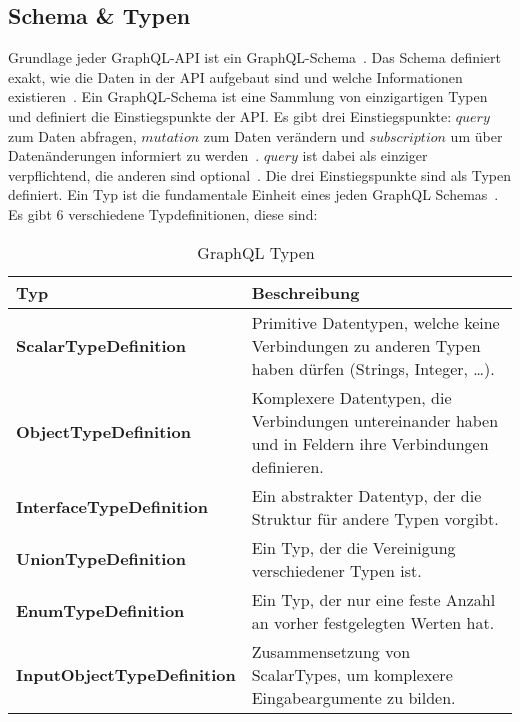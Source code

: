 \subsection{Schema \& Typen}
\label{schematypes}

Grundlage jeder GraphQL-API ist ein GraphQL-Schema~\cite[vgl. Core Concepts]{graphqlspecification}.
Das Schema definiert exakt, wie die Daten in der API aufgebaut sind und welche Informationen existieren~\cite[vgl. 3.2 Schema]{graphqlspecification}.
Ein GraphQL-Schema ist eine Sammlung von einzigartigen Typen und definiert die Einstiegspunkte der API.
Es gibt drei Einstiegspunkte: $query$ zum Daten abfragen, $mutation$ zum Daten verändern und $subscription$ um über Datenänderungen informiert zu werden~\cite[vgl. 3.2.1 Root Operation Types]{graphqlspecification}.
$query$ ist dabei als einziger verpflichtend, die anderen sind optional~\cite[vgl. 3.2.1]{graphqlspecification}.
Die drei Einstiegspunkte sind als Typen definiert.
Ein Typ ist die fundamentale Einheit eines jeden GraphQL Schemas~\cite[vgl. 3.4 Types]{graphqlspecification}.
\newpage
Es gibt 6 verschiedene Typdefinitionen, diese sind:

\begin{center}
    \begin{table}[!ht]
        \begin{tabularx}{\textwidth}{|C|C|}
            \hline
            \textbf{ Typ } & \textbf{ Beschreibung} \\
            \hline
            \textbf{ ScalarTypeDefinition } & Primitive Datentypen, welche keine Verbindungen zu anderen Typen haben dürfen (Strings, Integer, \ldots). \\
            \hline
            \textbf{ ObjectTypeDefinition  } & Komplexere Datentypen, die Verbindungen untereinander haben und in Feldern ihre Verbindungen definieren. \\
            \hline
            \textbf{ InterfaceTypeDefinition } & Ein abstrakter Datentyp, der die Struktur für andere Typen vorgibt. \\
            \hline
            \textbf{ UnionTypeDefinition } & Ein Typ, der die Vereinigung verschiedener Typen ist. \\
            \hline
            \textbf{ EnumTypeDefinition } & Ein Typ, der nur eine feste Anzahl an vorher festgelegten Werten hat. \\
            \hline
            \textbf{ InputObjectTypeDefinition } & Zusammensetzung von ScalarTypes, um komplexere Eingabeargumente zu bilden.  \\
            \hline
        \end{tabularx}
        \caption{GraphQL Typen~\cite[vgl. 3.4 Types]{graphqlspecification}}
    \end{table}
\end{center}

